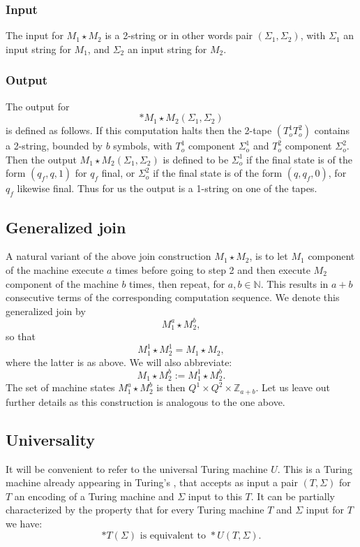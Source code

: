 \documentclass[9pt,twocolumn,twoside,lineno]{pnas-new}
\numberwithin{equation}{section}
\theoremstyle{definition}
\theoremstyle{remark}
\begin{document}
\subsubsection {Input}
The input for $M _{1} \star M _{2}  $ is a 2-string or in other words pair $(\Sigma _{1}, \Sigma _{2}  )$, with $\Sigma _{1} $ an input string for $M _{1} $, and $\Sigma _{2} $ an input string for $M _{2} $.
\subsubsection {Output} The output for $$*M _{1} \star M _{2} (\Sigma _{1}, \Sigma _{2}  )  $$ is defined as follows. If this computation halts then the 2-tape $(T ^{1} _{o} T ^{2} _{o}    )$ contains a 2-string, bounded by $b$ symbols, with $T ^{1} _{o}  $ component $\Sigma ^{1} _{o}$ and $T ^{2} _{o}  $ component $\Sigma ^{2} _{o}$.
Then the output $M _{1} \star M _{2} (\Sigma _{1}, \Sigma _{2}  )$ is defined to be $\Sigma ^{1} _{o}  $ if the final state is of the form $(q _{f},  q, 1) $ for $q _{f} $ final, or $\Sigma ^{2} _{o}  $ if the final state is of the form $(q,  q _{f},0) $, for $q _{f} $ likewise final. Thus for us the output is a 1-string on one of the tapes.  
\subsection {Generalized join}
A natural variant of the above join construction $M _{1} \star M _{2}  $, is to let $M _{1} $ component of the machine execute $a$ times before going to step 2 and then execute $M _{2} 
$ component of the machine $b$ times, then repeat, for $a,b \in \mathbb{N}$. This results in $a+b$ consecutive terms of the corresponding computation sequence.
We denote this generalized join by  $$M _{1} ^{a} \star M _{2} ^{b},    $$ so that $$M_1 ^{1} \star M ^{1}  _{2}   = M _{1} \star M _{2},   $$
where the latter is as above.  We will also abbreviate: $$M _{1} \star M _{2} ^{b}:=   M _{1} ^{1} \star M _{2} ^{b}.
$$ 
The set of machine states $M _{1} ^{a} \star M _{2} ^{b}    $ is then $Q ^{1} \times Q ^{2} \times \mathbb{Z} _{a+b}   $. Let us leave out further details as this construction is analogous to the one above.
\subsection {Universality} It will be convenient to refer to the universal Turing machine $U$. This is a Turing machine already appearing in Turing's \cite{TuringComputableNumbers}, that accepts as input a pair $(T,\Sigma)$ for $T$ an encoding of a Turing machine and $\Sigma$ input to this $T$. It can be partially characterized by the property that for every Turing machine $T$ and $\Sigma$ input for $T$ we have:
\begin{equation*}
   *T (\Sigma) \text{ is equivalent to } *U (T,\Sigma).
\end{equation*}
\end{document}
